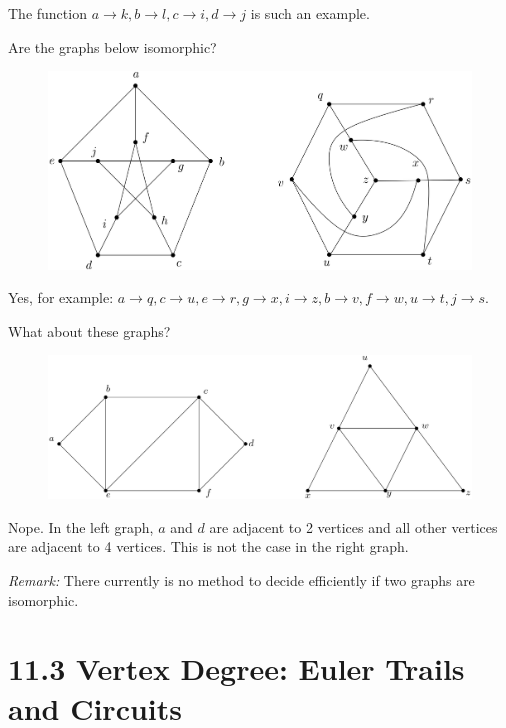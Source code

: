 \documentclass[11pt]{article}
\begin{document}
    The function \(a \rightarrow k, b \rightarrow l, c \rightarrow i, d \rightarrow j\) is such an example.

    \vspace{1em}

    Are the graphs below isomorphic?

    \begin{figure}[H]
        \centering
        \includegraphics[scale=0.2]{iso3.png}
    \end{figure}

    Yes, for example: \(a \rightarrow q, c \rightarrow u, e \rightarrow r, g \rightarrow x, i \rightarrow z, b \rightarrow v, f \rightarrow w, u \rightarrow t, j \rightarrow s\).

    \pagebreak

    What about these graphs?
    \begin{figure}[H]
        \centering
        \includegraphics[scale=0.2]{iso4.png}
    \end{figure}

    Nope. In the left graph, $a$ and $d$ are adjacent to 2 vertices and all other vertices are adjacent to 4 vertices. This is not the case in the right graph.

    \vspace{1em}

    \emph{Remark:} There currently is no method to decide efficiently if two graphs are isomorphic.

    \section{11.3 Vertex Degree: Euler Trails and Circuits}
\end{document}
